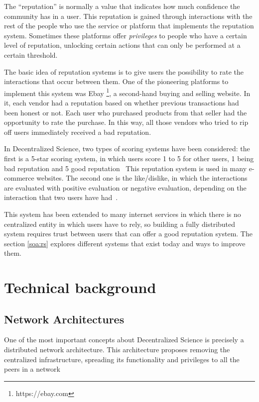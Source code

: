The ``reputation'' is normally a value that indicates how much confidence the
community has in a user. This reputation is gained through interactions with the
rest of the people who use the service or platform that implements the
reputation system. Sometimes these platforms offer \emph{privileges} to people
who have a certain level of reputation, unlocking certain actions that can only
be performed at a certain threshold.

The basic idea of reputation systems is to give users the possibility to rate
the interactions that occur between them. One of the pioneering platforms to
implement this system was Ebay \footnote{https://ebay.com}, a second-hand buying
and selling website. In it, each vendor had a reputation based on whether
previous transactions had been honest or not. Each user who purchased products
from that seller had the opportunity to rate the purchase. In this way, all
those vendors who tried to rip off users immediately received a bad reputation.

In Decentralized Science, two types of scoring systems have been considered: the
first is a 5-star scoring system, in which users score 1 to 5 for other users, 1
being bad reputation and 5 good reputation~\cite{} This reputation system is
used in many e-commerce websites. The second one is the like/dislike, in which
the interactions are evaluated with positive evaluation or negative evaluation,
depending on the interaction that two users have had~\cite{}.

This system has been extended to many internet services in which there is no
centralized entity in which users have to rely, so building a fully distributed
system requires trust between users that can offer a good reputation system. The
section \ref{soa:rs} explores different systems that exist today and ways to
improve them.

\section{Technical background}
\label{tb}
\subsection{Network Architectures}
\label{tb:na}

One of the most important concepts about Decentralized Science is precisely a
distributed network architecture. This architecture proposes removing the
centralized infrastructure, spreading its functionality and privileges to all
the peers in a network

